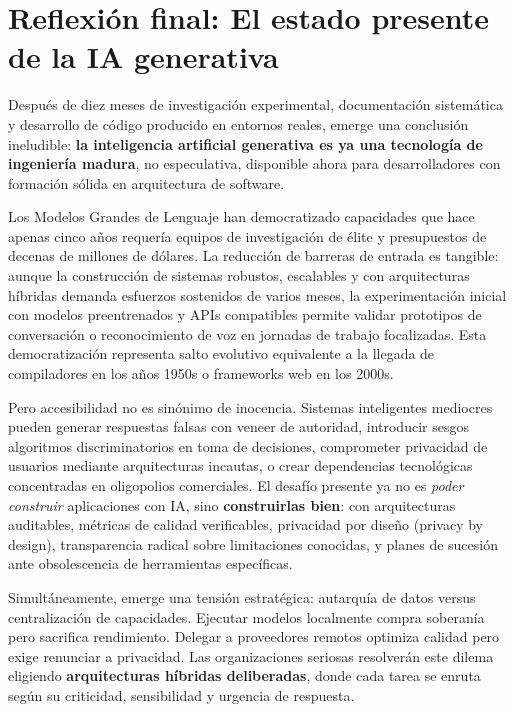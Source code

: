 \documentclass[12pt,a4paper]{report}
\numberwithin{figure}{section}
\begin{document}
\section{Reflexión final: El estado presente de la IA generativa}
\label{sec:reflexion_final}

Después de diez meses de investigación experimental, documentación sistemática y desarrollo de código producido en entornos reales, emerge una conclusión ineludible: \textbf{la inteligencia artificial generativa es ya una tecnología de ingeniería madura}, no especulativa, disponible ahora para desarrolladores con formación sólida en arquitectura de software.

Los Modelos Grandes de Lenguaje han democratizado capacidades que hace apenas cinco años requería equipos de investigación de élite y presupuestos de decenas de millones de dólares. La reducción de barreras de entrada es tangible: aunque la construcción de sistemas robustos, escalables y con arquitecturas híbridas demanda esfuerzos sostenidos de varios meses, la experimentación inicial con modelos preentrenados y APIs compatibles permite validar prototipos de conversación o reconocimiento de voz en jornadas de trabajo focalizadas. Esta democratización representa salto evolutivo equivalente a la llegada de compiladores en los años 1950s o frameworks web en los 2000s.

Pero accesibilidad no es sinónimo de inocencia. Sistemas inteligentes mediocres pueden generar respuestas falsas con veneer de autoridad, introducir sesgos algoritmos discriminatorios en toma de decisiones, comprometer privacidad de usuarios mediante arquitecturas incautas, o crear dependencias tecnológicas concentradas en oligopolios comerciales. El desafío presente ya no es \textit{poder construir} aplicaciones con IA, sino \textbf{construirlas bien}: con arquitecturas auditables, métricas de calidad verificables, privacidad por diseño (privacy by design), transparencia radical sobre limitaciones conocidas, y planes de sucesión ante obsolescencia de herramientas específicas.

Simultáneamente, emerge una tensión estratégica: autarquía de datos versus centralización de capacidades. Ejecutar modelos localmente compra soberanía pero sacrifica rendimiento. Delegar a proveedores remotos optimiza calidad pero exige renunciar a privacidad. Las organizaciones seriosas resolverán este dilema eligiendo \textbf{arquitecturas híbridas deliberadas}, donde cada tarea se enruta según su criticidad, sensibilidad y urgencia de respuesta.
\end{document}

